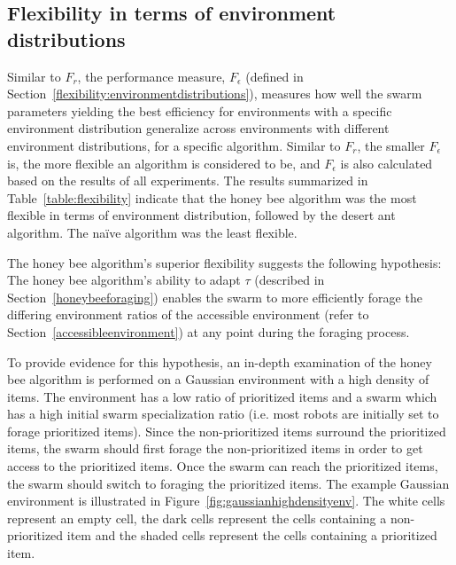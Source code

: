 \subsection{Flexibility in terms of environment distributions}
\label{setup:flexibility:environmentdistributions}

Similar to $F_r$, the performance measure, $F_\epsilon$ (defined in Section~\ref{flexibility:environmentdistributions}), measures how well the swarm parameters yielding the best efficiency for environments with a specific environment distribution generalize across environments with different environment distributions, for a specific algorithm. Similar to $F_r$, the smaller $F_\epsilon$ is, the more flexible an algorithm is considered to be, and $F_\epsilon$ is also calculated based on the results of all experiments. The results summarized in Table~\ref{table:flexibility} indicate that the honey bee algorithm was the most flexible in terms of environment distribution, followed by the desert ant algorithm. The na\"ive algorithm was the least flexible.

The honey bee algorithm's superior flexibility suggests the following hypothesis: The honey bee algorithm's ability to adapt $\tau$ (described in Section~\ref{honeybeeforaging}) enables the swarm to more efficiently forage the differing environment ratios of the accessible environment (refer to Section~\ref{accessibleenvironment}) at any point during the foraging process.

To provide evidence for this hypothesis, an in-depth examination of the honey bee algorithm is performed on a Gaussian environment with a high density of items. The environment has a low ratio of prioritized items and a swarm which has a high initial swarm specialization ratio (i.e. most robots are initially set to forage prioritized items). Since the non-prioritized items surround the prioritized items, the swarm should first forage the non-prioritized items in order to get access to the prioritized items. Once the swarm can reach the prioritized items, the swarm should switch to foraging the prioritized items. The example Gaussian environment is illustrated in Figure~\ref{fig:gaussianhighdensityenv}. The white cells represent an empty cell, the dark cells represent the cells containing a non-prioritized item and the shaded cells represent the cells containing a prioritized item. 

